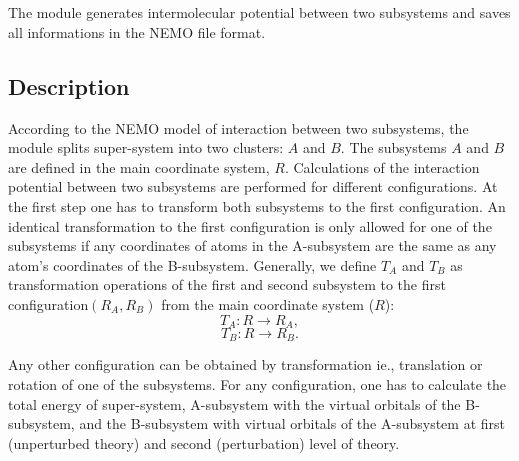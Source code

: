 
\section{}
\label{UG:sec:mknemo}


The  module generates intermolecular potential between two subsystems and saves all informations in the NEMO file format.
\subsection{Description}
\label{UG:sec:mknemo_description}
According to the NEMO model of interaction between two subsystems, the  module splits super-system into two clusters: $A$ and $B$. The subsystems $A$ and $B$ are defined in the main coordinate system, $R$. Calculations of the interaction potential between two subsystems are performed for different configurations. At the first step one has to transform both subsystems to the first configuration. An identical transformation to the first configuration is only allowed for one of the subsystems if any coordinates of atoms in the A-subsystem are the same as any atom's coordinates of the B-subsystem. Generally, we define $T_A$ and $T_B$ as transformation operations of the first and second subsystem to the first configuration$(R_A,R_B)$ from the main coordinate system ($R$):
$$T_A: R \rightarrow R_A,$$
$$T_B: R \rightarrow R_B.$$


Any other configuration can be obtained by transformation ie., translation or rotation of one of the subsystems. For any configuration, one has to calculate the total energy of super-system, A-subsystem with the virtual orbitals of the B-subsystem, and the B-subsystem with virtual orbitals of the A-subsystem at first (unperturbed  theory) and second (perturbation) level of theory.

